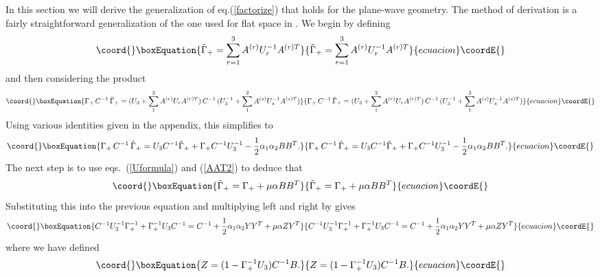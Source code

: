 \documentclass[a4paper,12pt]{article}
\begin{document}
In this section we will derive the generalization of
eq.(\ref{factorize}) that holds for the plane-wave geometry. The
method of derivation is a fairly straightforward generalization of
the one used for flat space in \cite{Green:1982tc}. We begin by
defining
\begin{equation}\coord{}\boxEquation{ \label{tildeG}
\tilde\Gamma_+ = \sum_{r=1}^3 A^{(r)} U_r^{-1} A^{(r)T}
}{ \tilde\Gamma_+ = \sum_{r=1}^3 A^{(r)} U_r^{-1} A^{(r)T}
}{ecuacion}\coordE{}\end{equation}
and then considering the product
\begin{equation}\coord{}\boxEquation{
\Gamma_+\,  C^{-1}\,  \tilde\Gamma_+ = (U_3 + \sum_1^2 A^{(r)} U_r
A^{(r)T})\, C^{-1}\, (U_3^{-1} + \sum_1^2 A^{(s)} U_s^{-1}
A^{(s)T})
}{
\Gamma_+\,  C^{-1}\,  \tilde\Gamma_+ = (U_3 + \sum_1^2 A^{(r)} U_r
A^{(r)T})\, C^{-1}\, (U_3^{-1} + \sum_1^2 A^{(s)} U_s^{-1}
A^{(s)T})
}{ecuacion}\coordE{}\end{equation}
Using various identities given in the appendix, this simplifies to
\begin{equation}\coord{}\boxEquation{
\Gamma_+\,  C^{-1}\,  \tilde\Gamma_+ = U_3 C^{-1} \tilde\Gamma_+ +
\Gamma_+ C^{-1} U_3^{-1} -{1\over 2} \alpha_1 \alpha_2 B B^T.
}{
\Gamma_+\,  C^{-1}\,  \tilde\Gamma_+ = U_3 C^{-1} \tilde\Gamma_+ +
\Gamma_+ C^{-1} U_3^{-1} -{1\over 2} \alpha_1 \alpha_2 B B^T.
}{ecuacion}\coordE{}\end{equation}
The next step is to use eqs.~(\ref{Uformula}) and (\ref{AAT2}) to
deduce that
\begin{equation}\coord{}\boxEquation{
\tilde\Gamma_+ = \Gamma_+ + \mu \alpha BB^T
}{
\tilde\Gamma_+ = \Gamma_+ + \mu \alpha BB^T
}{ecuacion}\coordE{}\end{equation}
Substituting this into the previous equation and multiplying left
and right by \coordHE{} gives
\begin{equation}\coord{}\boxEquation{ \label{idwithZ}
C^{-1} U_3^{-1} \Gamma_+^{-1} + \Gamma_+^{-1} U_3 C^{-1} = C^{-1}
+ {1\over2} \alpha_1 \alpha_2 Y Y^T + \mu \alpha Z Y^T
}{ C^{-1} U_3^{-1} \Gamma_+^{-1} + \Gamma_+^{-1} U_3 C^{-1} = C^{-1}
+ {1\over2} \alpha_1 \alpha_2 Y Y^T + \mu \alpha Z Y^T
}{ecuacion}\coordE{}\end{equation}
where we have defined
\begin{equation}\coord{}\boxEquation{
Z = (1 -\Gamma_+^{-1} U_3) C^{-1} B.
}{
Z = (1 -\Gamma_+^{-1} U_3) C^{-1} B.
}{ecuacion}\coordE{}\end{equation}
\end{document}
